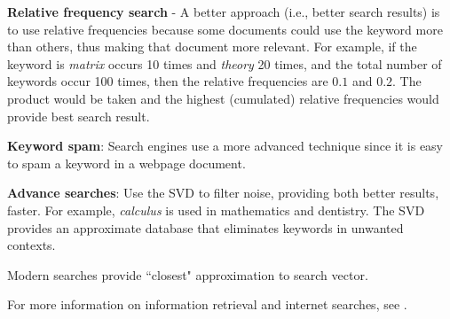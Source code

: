 \begin{enumerate}
\textbf{Relative frequency search} - A better approach (i.e., better search results) is to use relative frequencies because some documents could use the keyword more than others, thus making that document more relevant.  For example, if the keyword is \textit{matrix} occurs 10 times and \textit{theory} 20 times, and the total number of keywords occur 100 times, then the relative frequencies are $0.1$ and $0.2$.  The product would be taken and the highest (cumulated) relative frequencies would provide best search result.  

\textbf{Keyword spam}:  Search engines use a more advanced technique since it is easy to spam a keyword in a webpage document.  


\textbf{Advance searches}:  Use the SVD to filter noise, providing both better results, faster.  For example, \textit{calculus} is used in mathematics and dentistry.  The SVD provides an approximate database   that eliminates keywords in unwanted contexts.

Modern searches provide ``closest" approximation to search vector.  

For more information on information retrieval and internet searches, see \cite{berry2005understanding}.

\end{enumerate}